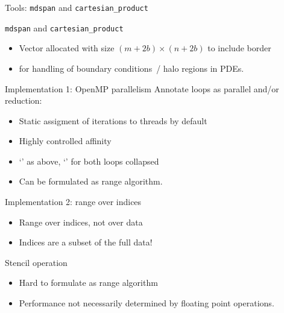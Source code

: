 \documentclass[10pt]{beamer}
\begin{document}
\begin{frame}[containsverbatim]{Tools: \texttt{mdspan} and \texttt{cartesian\_product}}
  \hbox\bgroup
  \egroup
\end{frame}

\begin{frame}[containsverbatim]{\texttt{mdspan} and \texttt{cartesian\_product}}
  \begin{itemize}
  \item Vector allocated with size $(m+2b)\times(n+2b)$ to include border
  \item for handling of boundary conditions~/ halo regions in PDEs.
  \end{itemize}
\end{frame}

\begin{frame}[containsverbatim]{Implementation 1: OpenMP parallelism}
  Annotate loops as parallel and/or reduction:
  \begin{itemize}
  \item Static assigment of iterations to threads by default
  \item Highly controlled affinity
  \item `' as above, `' for both loops collapsed
  \item Can be formulated as range algorithm.
  \end{itemize}
\end{frame}

\begin{frame}[containsverbatim]{Implementation 2: range over indices}
  \begin{itemize}
  \item Range over indices, not over data
  \item Indices are a subset of the full data!
  \end{itemize}
\end{frame}

\begin{frame}[containsverbatim]{Stencil operation}
  \begin{itemize}
  \item Hard to formulate as range algorithm
  \item Performance not necessarily determined by floating point operations.
  \end{itemize}
\end{frame}
\end{document}
